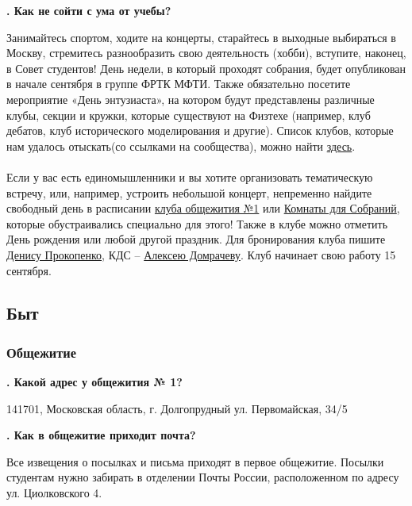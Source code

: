 \documentclass[14pt]{extarticle}
\newcounter{question}
\newcommand\Que[1]{%
    \begin{minipage}{\textwidth}
    \leavevmode\par
    \stepcounter{question}
    \noindent
    {\large\textbf{\thequestion. #1}}\par}
\newcommand\Ans[2][]{%
    \leavevmode\par\noindent
    {\leftskip37pt
    \textbf{#1}#2\par}
    \end{minipage}}
\begin{document}
\Que{Как не сойти с ума от учебы?}
\Ans{Занимайтесь спортом, ходите на концерты, старайтесь в выходные выбираться в Москву, стремитесь разнообразить свою деятельность (хобби), вступите, наконец, в Совет студентов! День недели, в который проходят собрания, будет опубликован в начале сентября в группе ФРТК МФТИ. Также обязательно посетите мероприятие «День энтузиаста», на котором будут представлены различные клубы, секции и кружки, которые существуют на Физтехе (например, клуб дебатов, клуб исторического моделирования и другие). Список клубов, которые нам удалось отыскать(со ссылками на сообщества), можно найти \href{https://vk.com/page-17708_53470574}{здесь}. \\ \\ Если у вас есть единомышленники и вы хотите организовать тематическую встречу, или, например, устроить небольшой концерт, непременно найдите свободный день в расписании \href{https://calendar.google.com/calendar/embed?src=ffse5gki3k4f9j266789sbj5ns@group.calendar.google.com&ctz=Europe/Moscow}{клуба общежития №1} или \href{https://frtk.mipt.ru/services/meeting/}{Комнаты для Собраний}, которые обустраивались специально для этого! Также в клубе можно отметить День рождения или любой другой праздник. Для бронирования клуба пишите \href{https://vk.com/denproc}{Денису Прокопенко}, КДС -- \href{https://vk.com/domrachev_alexey}{Алексею Домрачеву}. Клуб начинает свою работу 15 сентября.}


\clearpage
\setcounter{question}{0}
\subsection{Быт}
\subsubsection{Общежитие}

\Que{Какой адрес у общежития № 1?}
\Ans{141701, Московская область, г. Долгопрудный ул. Первомайская, 34/5}

\Que{Как в общежитие приходит почта?}
\Ans{Все извещения о посылках и письма приходят в первое общежитие. Посылки студентам нужно забирать в отделении Почты России, расположенном по адресу ул. Циолковского 4.}
\end{document}
